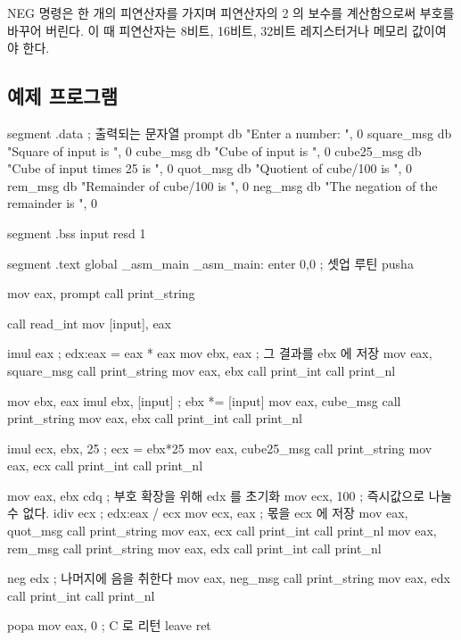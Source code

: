 {\code NEG} 명령은 한 개의 피연산자를 가지며 피연산자의 2 의 보수를 계산함으로써
부호를 바꾸어 버린다. 이 때 피연산자는 8비트, 16비트, 32비트
레지스터거나 메모리 값이여야 한다. 

\subsection{예제 프로그램}
\begin{AsmCodeListing}[label=math.asm]
segment .data         ; 출력되는 문자열
prompt          db    "Enter a number: ", 0
square_msg      db    "Square of input is ", 0
cube_msg        db    "Cube of input is ", 0
cube25_msg      db    "Cube of input times 25 is ", 0
quot_msg        db    "Quotient of cube/100 is ", 0
rem_msg         db    "Remainder of cube/100 is ", 0
neg_msg         db    "The negation of the remainder is ", 0

segment .bss
input   resd 1

segment .text
        global  _asm_main
_asm_main:
        enter   0,0               ; 셋업 루틴
	pusha

        mov     eax, prompt
        call    print_string

        call    read_int
        mov     [input], eax

        imul    eax               ; edx:eax = eax * eax
        mov     ebx, eax          ; 그 결과를 ebx 에 저장
        mov     eax, square_msg
        call    print_string
        mov     eax, ebx
        call    print_int
        call    print_nl

        mov     ebx, eax
        imul    ebx, [input]      ; ebx *= [input]
        mov     eax, cube_msg
        call    print_string
        mov     eax, ebx
        call    print_int
        call    print_nl

        imul    ecx, ebx, 25      ; ecx = ebx*25
        mov     eax, cube25_msg
        call    print_string
        mov     eax, ecx
        call    print_int
        call    print_nl

        mov     eax, ebx
        cdq                       ; 부호 확장을 위해 edx 를 초기화
        mov     ecx, 100          ; 즉시값으로 나눌 수 없다. 
        idiv    ecx               ; edx:eax / ecx
        mov     ecx, eax          ; 몫을 ecx 에 저장
        mov     eax, quot_msg
        call    print_string
        mov     eax, ecx
        call    print_int
        call    print_nl
        mov     eax, rem_msg
        call    print_string
        mov     eax, edx
        call    print_int
        call    print_nl
        
        neg     edx               ; 나머지에 음을 취한다
        mov     eax, neg_msg
        call    print_string
        mov     eax, edx
        call    print_int
        call    print_nl

        popa
        mov     eax, 0            ; C 로 리턴
        leave                     
        ret
\end{AsmCodeListing}

